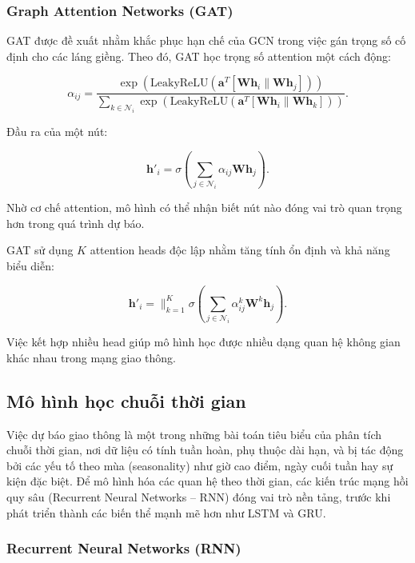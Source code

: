 \subsubsection{Graph Attention Networks (GAT)}

GAT được đề xuất nhằm khắc phục hạn chế của GCN trong việc gán trọng số cố định cho các láng giềng. Theo đó, GAT học trọng số attention một cách động:

\[
\alpha_{ij} = 
\frac{\exp\left(\text{LeakyReLU}\left(\mathbf{a}^T[\mathbf{W}\mathbf{h}_i \| \mathbf{W}\mathbf{h}_j]\right)\right)}
{\sum_{k \in \mathcal{N}_i} \exp\left(\text{LeakyReLU}\left(\mathbf{a}^T[\mathbf{W}\mathbf{h}_i \| \mathbf{W}\mathbf{h}_k]\right)\right)}.
\]

Đầu ra của một nút:

\[
\mathbf{h}'_i = \sigma\left(\sum_{j \in \mathcal{N}_i} \alpha_{ij} \mathbf{W}\mathbf{h}_j\right).
\]

Nhờ cơ chế attention, mô hình có thể nhận biết nút nào đóng vai trò quan trọng hơn trong quá trình dự báo.


GAT sử dụng $K$ attention heads độc lập nhằm tăng tính ổn định và khả năng biểu diễn:

\[
\mathbf{h}'_i 
= \bigg\|_{k=1}^K 
\sigma\left(\sum_{j \in \mathcal{N}_i} \alpha_{ij}^k \mathbf{W}^k \mathbf{h}_j\right).
\]

Việc kết hợp nhiều head giúp mô hình học được nhiều dạng quan hệ không gian khác nhau trong mạng giao thông.

\subsection{Mô hình học chuỗi thời gian}

Việc dự báo giao thông là một trong những bài toán tiêu biểu của phân tích chuỗi thời gian, nơi dữ liệu có tính tuần hoàn, phụ thuộc dài hạn, và bị tác động bởi các yếu tố theo mùa (seasonality) như giờ cao điểm, ngày cuối tuần hay sự kiện đặc biệt. Để mô hình hóa các quan hệ theo thời gian, các kiến trúc mạng hồi quy sâu (Recurrent Neural Networks – RNN) đóng vai trò nền tảng, trước khi phát triển thành các biến thể mạnh mẽ hơn như LSTM và GRU.

\subsubsection{Recurrent Neural Networks (RNN)}

